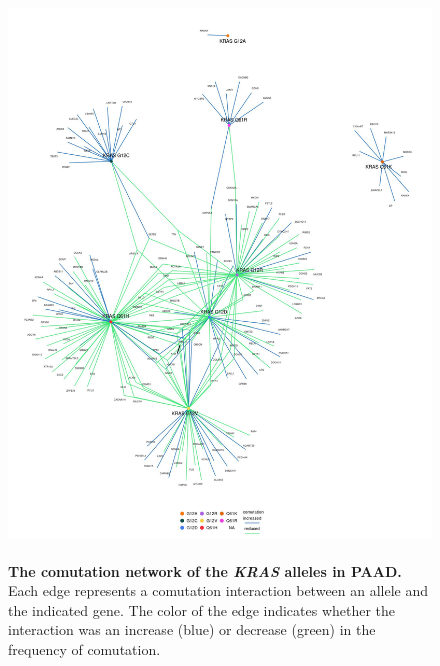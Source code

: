 \documentclass[english, 12pt, letterpaper]{article}
\newcommand{\KRAS}{\emph{KRAS}}
\begin{document}
\begin{figure}[p]
\centering
\includegraphics[height=150mm]{figures/SuppFigure_10.jpeg}
\caption{
    \textbf{The comutation network of the \KRAS{} alleles in PAAD.}
    Each edge represents a comutation interaction between an allele and the indicated gene. The color of the edge indicates whether the interaction was an increase (blue) or decrease (green) in the frequency of comutation.
}
\label{sfig:paad_labeled-comutation}
\end{figure}
\end{document}
